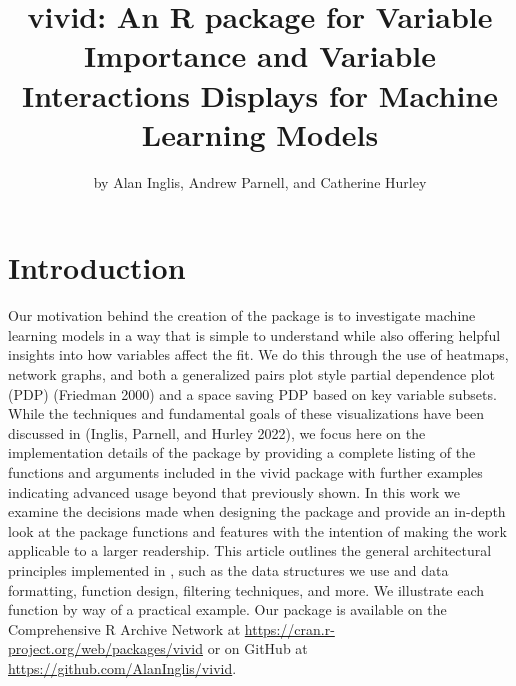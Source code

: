 \title{vivid: An R package for Variable Importance and Variable Interactions Displays for Machine Learning Models}
\author{by Alan Inglis, Andrew Parnell, and Catherine Hurley}

\maketitle


\hypertarget{introduction}{%
\section{Introduction}\label{introduction}}

Our motivation behind the creation of the  package is to investigate machine learning
models in a way that is simple to understand while also offering helpful
insights into how variables affect the fit. We do this through the use
of heatmaps, network graphs, and both a generalized pairs plot style
partial dependence plot (PDP) (Friedman 2000) and a space saving PDP based
on key variable subsets. While the techniques and fundamental goals of
these visualizations have been discussed in (Inglis, Parnell, and Hurley 2022), we
focus here on the implementation details of the package by providing a
complete listing of the functions and arguments included in the vivid
package with further examples indicating advanced usage beyond that
previously shown. In this work we examine the decisions made when
designing the package and provide an in-depth look at the package
functions and features with the intention of making the work applicable
to a larger readership. This article outlines the general architectural
principles implemented in , such as the data structures we use and data
formatting, function design, filtering techniques, and more. We
illustrate each function by way of a practical example. Our package is
available on the Comprehensive R Archive Network at
\url{https://cran.r-project.org/web/packages/vivid} or on GitHub at
\url{https://github.com/AlanInglis/vivid}.

